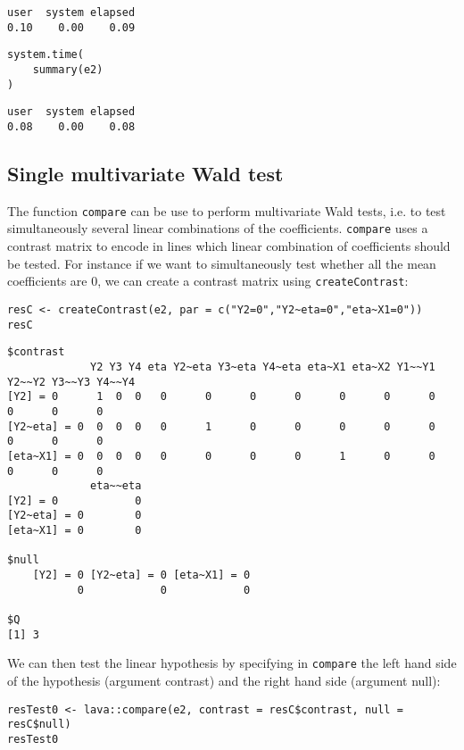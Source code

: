 \documentclass[12pt]{article}
\begin{document}
\begin{verbatim}
user  system elapsed 
0.10    0.00    0.09
\end{verbatim}

\lstset{language=r,label= ,caption= ,captionpos=b,numbers=none}
\begin{lstlisting}
system.time(
	summary(e2)
)
\end{lstlisting}

\begin{verbatim}
user  system elapsed 
0.08    0.00    0.08
\end{verbatim}

\subsection{Single multivariate Wald test}
\label{sec:orgf03d592}

The function \texttt{compare} can be use to perform multivariate Wald tests,
i.e. to test simultaneously several linear combinations of the
coefficients.  \texttt{compare} uses a contrast matrix to encode in lines
which linear combination of coefficients should be tested. For
instance if we want to simultaneously test whether all the mean
coefficients are 0, we can create a contrast matrix using
\texttt{createContrast}:
\lstset{language=r,label= ,caption= ,captionpos=b,numbers=none}
\begin{lstlisting}
resC <- createContrast(e2, par = c("Y2=0","Y2~eta=0","eta~X1=0"))
resC
\end{lstlisting}

\begin{verbatim}
$contrast
             Y2 Y3 Y4 eta Y2~eta Y3~eta Y4~eta eta~X1 eta~X2 Y1~~Y1 Y2~~Y2 Y3~~Y3 Y4~~Y4
[Y2] = 0      1  0  0   0      0      0      0      0      0      0      0      0      0
[Y2~eta] = 0  0  0  0   0      1      0      0      0      0      0      0      0      0
[eta~X1] = 0  0  0  0   0      0      0      0      1      0      0      0      0      0
             eta~~eta
[Y2] = 0            0
[Y2~eta] = 0        0
[eta~X1] = 0        0

$null
    [Y2] = 0 [Y2~eta] = 0 [eta~X1] = 0 
           0            0            0 

$Q
[1] 3
\end{verbatim}

We can then test the linear hypothesis by specifying in \texttt{compare} the
left hand side of the hypothesis (argument contrast) and the right
hand side (argument null):
\lstset{language=r,label= ,caption= ,captionpos=b,numbers=none}
\begin{lstlisting}
resTest0 <- lava::compare(e2, contrast = resC$contrast, null = resC$null)
resTest0
\end{lstlisting}
\end{document}
